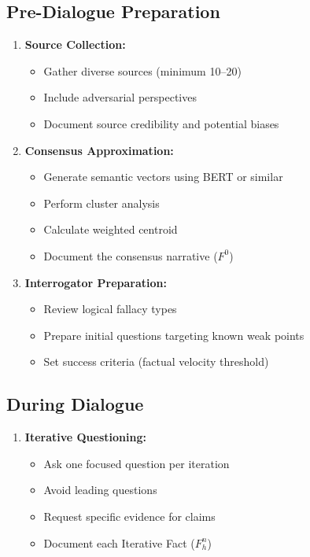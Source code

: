 \documentclass[11pt,a4paper]{article}
\begin{document}
\begin{small}
\subsection*{Pre-Dialogue Preparation}
\begin{enumerate}[leftmargin=*]
    \item \textbf{Source Collection:}
    \begin{itemize}[nosep]
        \item Gather diverse sources (minimum 10--20)
        \item Include adversarial perspectives
        \item Document source credibility and potential biases
    \end{itemize}
    
    \item \textbf{Consensus Approximation:}
    \begin{itemize}[nosep]
        \item Generate semantic vectors using BERT or similar
        \item Perform cluster analysis
        \item Calculate weighted centroid
        \item Document the consensus narrative ($F^0$)
    \end{itemize}
    
    \item \textbf{Interrogator Preparation:}
    \begin{itemize}[nosep]
        \item Review logical fallacy types
        \item Prepare initial questions targeting known weak points
        \item Set success criteria (factual velocity threshold)
    \end{itemize}
\end{enumerate}

\subsection*{During Dialogue}
\begin{enumerate}[leftmargin=*, resume]
    \item \textbf{Iterative Questioning:}
    \begin{itemize}[nosep]
        \item Ask one focused question per iteration
        \item Avoid leading questions
        \item Request specific evidence for claims
        \item Document each Iterative Fact ($F_h^n$)
    \end{itemize}
    

\end{enumerate}
\end{small}
\end{document}
